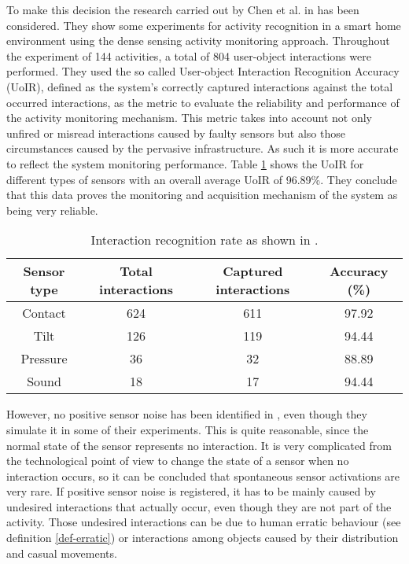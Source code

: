 To make this decision the research carried out by Chen et al. in \cite{Chen2012a} has been considered. They show some experiments for activity recognition in a smart home environment using the dense sensing activity monitoring approach. Throughout the experiment of 144 activities, a total of 804 user-object interactions were performed. They used the so called User-object Interaction Recognition Accuracy (UoIR), defined as the system’s correctly captured interactions against the total occurred interactions, as the metric to evaluate the reliability and performance of the activity monitoring mechanism. This metric takes into account not only unfired or misread interactions caused by faulty sensors but also those circumstances caused by the pervasive infrastructure. As such it is more accurate to reflect the system monitoring performance. Table \ref{tab-sensor-errors} shows the UoIR for different types of sensors with an overall average UoIR of 96.89\%. They conclude that this data proves the monitoring and acquisition mechanism of the system as being very reliable.

\begin{table}[htbp]\scriptsize
\begin{center}
 \begin{tabular}{cccc}
  \hline
  Sensor type & Total interactions & Captured interactions & Accuracy (\%) \\
  \hline
  Contact & 624 & 611 & 97.92 \\
  Tilt & 126 & 119 & 94.44 \\
  Pressure & 36 & 32 & 88.89 \\
  Sound & 18 & 17 & 94.44 \\
  \hline
 \end{tabular}
 \caption{Interaction recognition rate as shown in \cite{Chen2012a}.}
 \label{tab-sensor-errors}
\end{center} 
\end{table}

However, no positive sensor noise has been identified in \cite{Chen2012a}, even though they simulate it in some of their experiments. This is quite reasonable, since the normal state of the sensor represents no interaction. It is very complicated from the technological point of view to change the state of a sensor when no interaction occurs, so it can be concluded that spontaneous sensor activations are very rare. If positive sensor noise is registered, it has to be mainly caused by undesired interactions that actually occur, even though they are not part of the activity. Those undesired interactions can be due to human erratic behaviour (see definition \ref{def-erratic}) or interactions among objects caused by their distribution and casual movements. 

